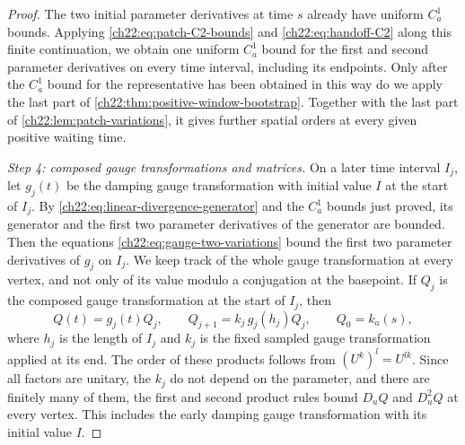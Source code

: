 \begin{proof}
The two initial parameter derivatives at time $s$ already have uniform $C_a^1$ bounds. Applying \eqref{ch22:eq:patch-C2-bounds} and \eqref{ch22:eq:handoff-C2} along this finite continuation, we obtain one uniform $C_a^1$ bound for the first and second parameter derivatives on every time interval, including its endpoints. Only after the $C_a^1$ bound for the representative has been obtained in this way do we apply the last part of \cref{ch22:thm:positive-window-bootstrap}. Together with the last part of \cref{ch22:lem:patch-variations}, it gives further spatial orders at every given positive waiting time.

\emph{Step 4: composed gauge transformations and matrices.} On a later time interval $I_j$, let $g_j(t)$ be the damping gauge transformation with initial value $I$ at the start of $I_j$. By \eqref{ch22:eq:linear-divergence-generator} and the $C_a^1$ bounds just proved, its generator and the first two parameter derivatives of the generator are bounded. Then the equations \eqref{ch22:eq:gauge-two-variations} bound the first two parameter derivatives of $g_j$ on $I_j$. We keep track of the whole gauge transformation at every vertex, and not only of its value modulo a conjugation at the basepoint. If $Q_j$ is the composed gauge transformation at the start of $I_j$, then
\begin{equation}\label{ch22:eq:accumulated-root-gauge}
 Q(t)=g_j(t)Q_j,\qquad Q_{j+1}=k_j\,g_j(h_j)Q_j,\qquad Q_0=k_a(s),
\end{equation}
where $h_j$ is the length of $I_j$ and $k_j$ is the fixed sampled gauge transformation applied at its end. The order of these products follows from $(U^k)^l=U^{lk}$. Since all factors are unitary, the $k_j$ do not depend on the parameter, and there are finitely many of them, the first and second product rules bound $D_uQ$ and $D_u^2Q$ at every vertex. This includes the early damping gauge transformation with its initial value $I$.


\end{proof}
